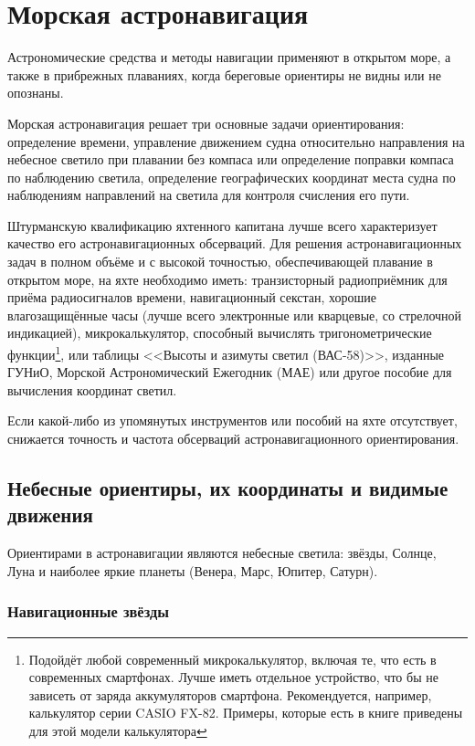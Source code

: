 \twocolumn

\chapter{Морская астронавигация\label{chap:7}}

Астрономические средства и методы навигации применяют в открытом море,
а также в прибрежных плаваниях, когда береговые ориентиры не видны или
не опознаны.

Морская астронавигация решает три основные задачи ориентирования:
определение времени, управление движением судна относительно
направления на небесное светило при плавании без компаса или
определение поправки компаса по наблюдению светила, определение
географических координат места судна по наблюдениям направлений на
светила для контроля счисления его пути.

Штурманскую квалификацию яхтенного капитана лучше всего характеризует
качество его астронавигационных обсерваций. Для решения
астронавигационных задач в полном объёме и с высокой точностью,
обеспечивающей плавание в открытом море, на яхте необходимо иметь:
транзисторный радиоприёмник для приёма радиосигналов времени,
навигационный секстан, хорошие влагозащищённые часы (лучше всего
электронные или кварцевые, со стрелочной индикацией),
микрокалькулятор, способный вычислять тригонометрические
функции\footnote{Подойдёт любой современный микрокалькулятор, включая
  те, что есть в современных смартфонах. Лучше иметь отдельное
  устройство, что бы не зависеть от заряда аккумуляторов смартфона.
  Рекомендуется, например, калькулятор серии CASIO FX-82. Примеры,
  которые есть в книге приведены для этой модели калькулятора}, или
таблицы <<Высоты и азимуты светил (ВАС-58)>>, изданные ГУНиО, Морской
Астрономический Ежегодник (МАЕ) или другое пособие для вычисления
координат светил.

Если какой-либо из упомянутых инструментов или пособий на яхте
отсутствует, снижается точность и частота обсерваций
астронавигационного ориентирования.

\section{Небесные ориентиры, их координаты и видимые движения\label{sec:7-1}}

Ориентирами в астронавигации являются небесные светила: звёзды,
Солнце, Луна и наиболее яркие планеты (Венера, Марс, Юпитер, Сатурн).

\subsection{Навигационные звёзды}


